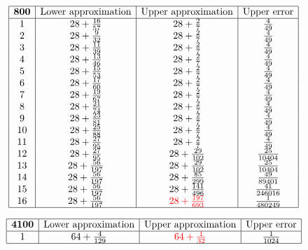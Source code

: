 \documentclass{amsart}
\begin{document}
 $$\begin{array}{|c|c|c|c|}
 \hline
 {\bf 800}&\text{Lower approximation}&\text{Upper approximation}&\text{Upper error}\\
 \hline
 1&28+\frac{16}{57}&28+\frac{2}{7}&\frac{4}{49}\\
2&28+\frac{9}{32}&28+\frac{2}{7}&\frac{4}{49}\\
3&28+\frac{11}{39}&28+\frac{2}{7}&\frac{4}{49}\\
4&28+\frac{13}{46}&28+\frac{2}{7}&\frac{4}{49}\\
5&28+\frac{15}{53}&28+\frac{2}{7}&\frac{4}{49}\\
6&28+\frac{17}{60}&28+\frac{2}{7}&\frac{4}{49}\\
7&28+\frac{19}{67}&28+\frac{2}{7}&\frac{4}{49}\\
8&28+\frac{21}{74}&28+\frac{2}{7}&\frac{4}{49}\\
9&28+\frac{23}{81}&28+\frac{2}{7}&\frac{4}{49}\\
10&28+\frac{25}{88}&28+\frac{2}{7}&\frac{4}{49}\\
11&28+\frac{27}{95}&28+\frac{2}{7}&\frac{4}{49}\\
12&28+\frac{27}{95}&28+\frac{29}{102}&\frac{25}{10404}\\
13&28+\frac{56}{197}&28+\frac{29}{102}&\frac{25}{10404}\\
14&28+\frac{56}{197}&28+\frac{85}{299}&\frac{49}{89401}\\
15&28+\frac{56}{197}&28+\frac{141}{496}&\frac{41}{246016}\\
16&28+\frac{56}{197}&{\color{red}28+\frac{197}{693}}&\frac{1}{480249}\\
 \hline
\end{array}$$

 $$\begin{array}{|c|c|c|c|}
 \hline
 {\bf 4100}&\text{Lower approximation}&\text{Upper approximation}&\text{Upper error}\\
 \hline
 1&64+\frac{4}{129}&{\color{red}64+\frac{1}{32}}&\frac{1}{1024}\\
 \hline
\end{array}$$
\end{document}
